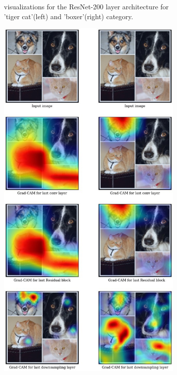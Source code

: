 \begin{figure}
\begin{subfigure}[t]{0.49\textwidth}
\begin{center}
     \caption{\gcam{}  visualizations for the ResNet-200 layer architecture for 'tiger cat'(left) and 'boxer'(right) category.}
 \end{center}
    \end{subfigure}
    \begin{subfigure}[t]{0.49\textwidth}
        \begin{center}
     \includegraphics[width=\linewidth]{figures/resnet_200_analysis-2.jpg}

\end{center}
\end{subfigure}
\end{figure}
